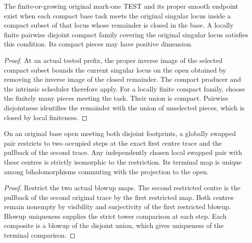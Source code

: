 \begin{theorem}
\label{hir:g8-compactly-isolated-original-singular}
\leanok
The finite-or-growing original mark-one TEST and its proper smooth
endpoint exist when each compact base task meets the original
singular locus inside a compact subset of that locus whose remainder
is closed in the base. A locally finite pairwise disjoint compact
family covering the original singular locus satisfies this condition.
Its compact pieces may have positive dimension.
\end{theorem}
\begin{proof}
At an actual tested prefix, the proper inverse image of the selected
compact subset bounds the current singular locus on the open obtained
by removing the inverse image of the closed remainder. The compact
producer and the intrinsic scheduler therefore apply. For a locally
finite compact family, choose the finitely many pieces meeting the
task. Their union is compact. Pairwise disjointness identifies the
remainder with the union of unselected pieces, which is closed by
local finiteness.
\end{proof}

\begin{proposition}
\label{hir:g8-visible-swap-restriction}
\leanok
On an original base open meeting both disjoint footprints, a
globally swapped pair restricts to two occupied steps at the exact
first centre trace and the pullback of the second trace. Any
independently chosen local swapped pair with these centres is
strictly isomorphic to the restriction. Its terminal map is unique
among biholomorphisms commuting with the projection to the open.
\end{proposition}
\begin{proof}
Restrict the two actual blowup maps. The second restricted centre is
the pullback of the second original trace by the first restricted
map. Both centres remain nonempty by visibility and surjectivity of
the first restricted blowup. Blowup uniqueness supplies the strict
tower comparison at each step. Each composite is a blowup of the
disjoint union, which gives uniqueness of the terminal comparison.
\end{proof}


